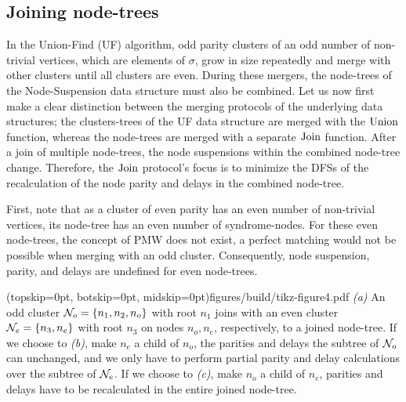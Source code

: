 \subsection{Joining node-trees}\label{sec:nodejoin}

In the Union-Find (UF) algorithm, odd parity clusters of an odd number of non-trivial vertices, which are elements of $\sigma$, grow in size repeatedly and merge with other clusters until all clusters are even. During these mergers, the node-trees of the Node-Suspension data structure must also be combined. Let us now first make a clear distinction between the merging protocols of the underlying data structures; the clusters-trees of the UF data structure are merged with the $\operatorname{Union}$ function, whereas the node-trees are merged with a separate $\operatorname{Join}$ function. After a join of multiple node-trees, the node suspensions within the combined node-tree change. Therefore, the $\operatorname{Join}$ protocol's focus is to minimize the DFSs of the recalculation of the node parity and delays in the combined node-tree. 

First, note that as a cluster of even parity has an even number of non-trivial vertices, its node-tree has an even number of syndrome-nodes. For these even node-trees, the concept of PMW does not exist, a perfect matching would not be possible when merging with an odd cluster. Consequently, node suspension, parity, and delays are undefined for even node-trees. 

\Figure[hbt](topskip=0pt, botskip=0pt, midskip=0pt){figures/build/tikz-figure4.pdf}{
    \emph{(a)} An odd cluster $\mathcal{N}_o=\{n_1, n_2, n_o\}$ with root $n_1$ joins with an even cluster $\mathcal{N}_e=\{n_3, n_e\}$ with root $n_3$ on nodes $n_o, n_e$, respectively, to a joined node-tree. If we choose to \emph{(b)}, make $n_e$ a child of $n_o$, the parities and delays the subtree of $\mathcal{N}_o$ can unchanged, and we only have to perform partial parity and delay calculations over the subtree of $\mathcal{N}_e$. If we choose to \emph{(c)}, make $n_o$ a child of $n_e$, parities and delays have to be recalculated in the entire joined node-tree. \label{fig4}}

